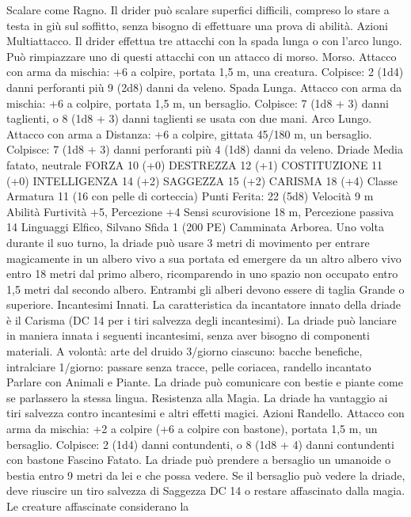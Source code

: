 \begin{multicols}{2}
Scalare come Ragno. Il drider può scalare superfici difficili,
compreso lo stare a testa in giù sul soffitto, senza bisogno di
effettuare una prova di abilità.
Azioni
Multiattacco. Il drider effettua tre attacchi con la spada lunga o
con l’arco lungo. Può rimpiazzare uno di questi attacchi con un
attacco di morso.
Morso. Attacco con arma da mischia: +6 a colpire, portata 1,5
m, una creatura.
Colpisce: 2 (1d4) danni perforanti più 9 (2d8) danni da veleno.
Spada Lunga. Attacco con arma da mischia: +6 a colpire,
portata 1,5 m, un bersaglio.
Colpisce: 7 (1d8 + 3) danni taglienti, o 8 (1d8 + 3) danni
taglienti se usata con due mani.
Arco Lungo. Attacco con arma a Distanza: +6 a colpire, gittata
45/180 m, un bersaglio.
Colpisce: 7 (1d8 + 3) danni perforanti più 4 (1d8) danni da
veleno.
Driade
Media fatato, neutrale
FORZA 10 (+0)
DESTREZZA 12 (+1)
COSTITUZIONE 11 (+0)
INTELLIGENZA 14 (+2)
SAGGEZZA 15 (+2)
CARISMA 18 (+4)
Classe Armatura 11 (16 con pelle di corteccia)
\hspace*{0pt}\hfill{Punti Ferita}: 22 (5d8)
Velocità 9 m
Abilità Furtività +5, Percezione +4
Sensi scurovisione 18 m, Percezione passiva 14
Linguaggi Elfico, Silvano
Sfida 1 (200 PE)
Camminata Arborea. Uno volta durante il suo turno, la driade
può usare 3 metri di movimento per entrare magicamente in un
albero vivo a sua portata ed emergere da un altro albero vivo
entro 18 metri dal primo albero, ricomparendo in uno spazio non
occupato entro 1,5 metri dal secondo albero. Entrambi gli alberi
devono essere di taglia Grande o superiore.
Incantesimi Innati. La caratteristica da incantatore innato della
driade è il Carisma (DC 14 per i tiri salvezza degli incantesimi).
La driade può lanciare in maniera innata i seguenti incantesimi,
senza aver bisogno di componenti materiali.
A volontà: arte del druido
3/giorno ciascuno: bacche benefiche, intralciare
1/giorno: passare senza tracce, pelle coriacea, randello
incantato
Parlare con Animali e Piante. La driade può comunicare con
bestie e piante come se parlassero la stessa lingua.
Resistenza alla Magia. La driade ha vantaggio ai tiri salvezza
contro incantesimi e altri effetti magici.
Azioni
Randello. Attacco con arma da mischia: +2 a colpire (+6 a
colpire con bastone), portata 1,5 m, un bersaglio.
Colpisce: 2 (1d4) danni contundenti, o 8 (1d8 + 4) danni
contundenti con bastone
Fascino Fatato. La driade può prendere a bersaglio un umanoide o
bestia entro 9 metri da lei e che possa vedere. Se il bersaglio può
vedere la driade, deve riuscire un tiro salvezza di Saggezza DC 14 o
restare affascinato dalla magia. Le creature affascinate considerano la

\end{multicols}
